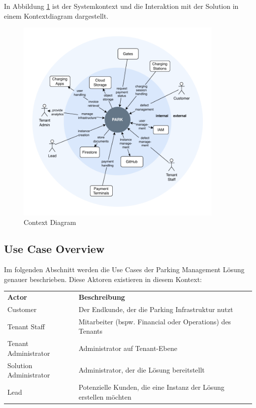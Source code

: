 In Abbildung \ref{fig:context-diagram} ist der Systemkontext und die Interaktion mit der Solution in einem Kontextdiagram dargestellt.

\begin{figure}[ht]
    \centering
    \includegraphics[width=0.9\textwidth]{resources/context-diagram.pdf}
    \caption{Context Diagram}
    \label{fig:context-diagram}
\end{figure}


\subsection{Use Case Overview}
Im folgenden Abschnitt werden die Use Cases der Parking Management Lösung genauer beschrieben. Diese Aktoren existieren in diesem Kontext:

\renewcommand{\arraystretch}{1.5}
{
\begin{longtable}{l p{10cm}}
    \textbf{Actor} & \textbf{Beschreibung} \\ [1ex]
    Customer & Der Endkunde, der die Parking Infrastruktur nutzt \\ [0.5ex]
    Tenant Staff & Mitarbeiter (bspw. Financial oder Operations) des Tenants \\ [0.5ex]
    Tenant Administrator & Administrator auf Tenant-Ebene \\ [0.5ex]
    Solution Administrator & Administrator, der die Lösung bereitstellt \\ [0.5ex]
    Lead & Potenzielle Kunden, die eine Instanz der Lösung erstellen möchten \\ 
\end{longtable}}

